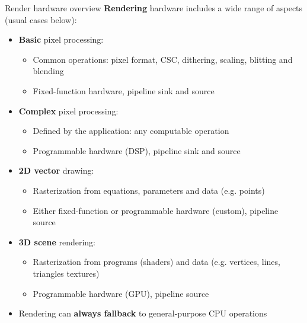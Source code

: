 \begin{frame}{Render hardware overview}
  \textbf{Rendering} hardware includes a wide range of aspects (usual cases below):
  \begin{itemize}
  \item \textbf{Basic} pixel processing:
  \begin{itemize}
    \item Common operations: pixel format, CSC, dithering, scaling, blitting and blending
    \item Fixed-function hardware, pipeline sink and source
  \end{itemize}
  \item \textbf{Complex} pixel processing:
  \begin{itemize}
    \item Defined by the application: any computable operation
    \item Programmable hardware (DSP), pipeline sink and source
  \end{itemize}
  \item \textbf{2D vector} drawing:
  \begin{itemize}
    \item Rasterization from equations, parameters and data (e.g. points)
    \item Either fixed-function or programmable hardware (custom), pipeline source
  \end{itemize}
  \item \textbf{3D scene} rendering:
  \begin{itemize}
    \item Rasterization from programs (shaders) and data (e.g. vertices, lines, triangles textures)
    \item Programmable hardware (GPU), pipeline source
  \end{itemize}
  \item Rendering can \textbf{always fallback} to general-purpose CPU operations
  \end{itemize}
\end{frame}

